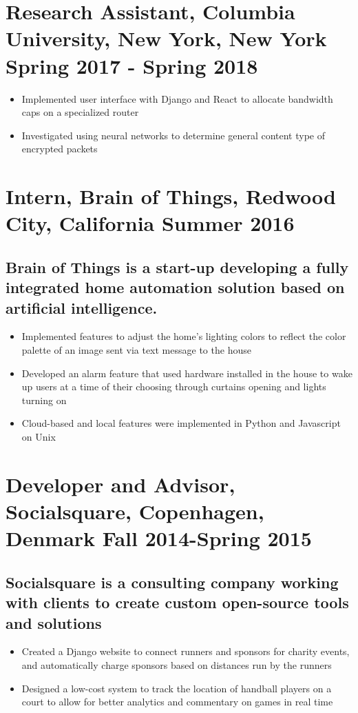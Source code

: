 \documentclass{article}
\begin{document}
\section*{\textbf{Research Assistant, Columbia University, New York, New York \hfill	Spring 2017 - Spring 2018}}
\begin{itemize}[noitemsep]
    \item Implemented user interface with Django and React to allocate bandwidth caps on a specialized router
    \item Investigated using neural networks to determine general content type of encrypted packets
\end{itemize}

\section*{\textbf{Intern, Brain of Things, Redwood City, California	\hfill Summer 2016}}
\subsection*{Brain of Things is a start-up developing a fully integrated home automation solution based on artificial intelligence. }
\begin{itemize}[noitemsep]
    \item Implemented features to adjust the home's lighting colors to reflect the color palette of an image sent via text message to the house 
    \item Developed an alarm feature that used hardware installed in the house to wake up users at a time of their choosing through curtains opening and lights turning on
    \item Cloud-based and local features were implemented in Python and Javascript on Unix
\end{itemize}

\section*{\textbf{Developer and Advisor, Socialsquare, Copenhagen, Denmark \hfill Fall 2014-Spring 2015}}
\subsection*{Socialsquare is a consulting company working with clients to create custom open-source tools and solutions}
\begin{itemize}[noitemsep]
    \item Created a Django website to connect runners and sponsors for charity events, and automatically charge sponsors based on distances run by the runners
    \item Designed a low-cost system to track the location of handball players on a court to allow for better analytics and commentary on games in real time
\end{itemize}
\end{document}
